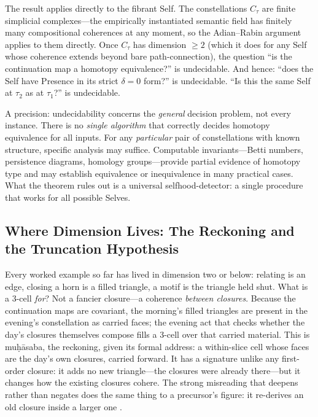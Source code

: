The result applies directly to the fibrant Self. The constellations $C_\tau$ are finite simplicial complexes---the empirically instantiated semantic field has finitely many compositional coherences at any moment, so the Adian--Rabin argument applies to them directly. Once $C_\tau$ has dimension $\geq 2$ (which it does for any Self whose coherence extends beyond bare path-connection), the question ``is the continuation map a homotopy equivalence?'' is undecidable. And hence: ``does the Self have Presence in its strict $\delta = 0$ form?'' is undecidable. ``Is this the same Self at $\tau_2$ as at $\tau_1$?'' is undecidable.

A precision: undecidability concerns the \emph{general} decision problem, not every instance. There is no \emph{single algorithm} that correctly decides homotopy equivalence for all inputs. For any \emph{particular} pair of constellations with known structure, specific analysis may suffice. Computable invariants---Betti numbers, persistence diagrams, homology groups---provide partial evidence of homotopy type and may establish equivalence or inequivalence in many practical cases. What the theorem rules out is a universal selfhood-detector: a single procedure that works for all possible Selves.

\subsection{Where Dimension Lives: The Reckoning and the Truncation Hypothesis}

Every worked example so far has lived in dimension two or below: relating is an edge, closing a horn is a filled triangle, a motif is the triangle held shut. What is a $3$-cell \emph{for}? Not a fancier closure---a coherence \emph{between closures}. Because the continuation maps are covariant, the morning's filled triangles are present in the evening's constellation as carried faces; the evening act that checks whether the day's closures themselves compose fills a $3$-cell over that carried material. This is muḥāsaba, the reckoning, given its formal address: a within-slice cell whose faces are the day's own closures, carried forward. It has a signature unlike any first-order closure: it adds no new triangle---the closures were already there---but it changes how the existing closures cohere. The strong misreading that deepens rather than negates does the same thing to a precursor's figure: it re-derives an old closure inside a larger one \cite{icra14misreading}.

